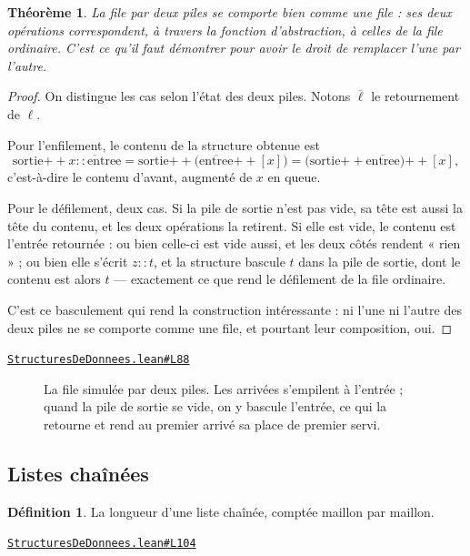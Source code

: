 \documentclass[11pt,a4paper]{article}
\theoremstyle{definition}
\newtheorem{definition}{Définition}
\theoremstyle{plain}
\newtheorem{theoreme}{Théorème}
\newcommand{\source}[2]{\par\smallskip\noindent\hfill{\footnotesize\href{#1}{\texttt{#2}}}\par\smallskip}
\begin{document}
\begin{theoreme}
La file par deux piles se comporte bien comme une file : ses deux opérations
correspondent, à travers la fonction d'abstraction, à celles de la file ordinaire.
C'est ce qu'il faut démontrer pour avoir le droit de remplacer l'une par l'autre.
\end{theoreme}
\begin{proof}
On distingue les cas selon l'état des deux piles. Notons \(\overline{\ell}\) le
retournement de \(\ell\).

Pour l'enfilement, le contenu de la structure obtenue est
\[ \mathrm{sortie} \mathbin{+\!\!+} \overline{x :: \mathrm{entree}}
   = \mathrm{sortie} \mathbin{+\!\!+}
     \bigl(\overline{\mathrm{entree}} \mathbin{+\!\!+} [x]\bigr)
   = \bigl(\mathrm{sortie} \mathbin{+\!\!+} \overline{\mathrm{entree}}\bigr)
     \mathbin{+\!\!+} [x] , \]
c'est-à-dire le contenu d'avant, augmenté de \(x\) en queue.

Pour le défilement, deux cas. Si la pile de sortie n'est pas vide, sa tête est aussi la
tête du contenu, et les deux opérations la retirent. Si elle est vide, le contenu est
l'entrée retournée : ou bien celle-ci est vide aussi, et les deux côtés rendent
« rien » ; ou bien elle s'écrit \(z :: t\), et la structure bascule \(t\) dans la pile de
sortie, dont le contenu est alors \(t\) — exactement ce que rend le défilement de la
file ordinaire.

C'est ce basculement qui rend la construction intéressante : ni l'une ni l'autre des
deux piles ne se comporte comme une file, et pourtant leur composition, oui.
\end{proof}
\source{https://github.com/Commutator-IO/learn-lean/blob/main/courses/02-lycee/11-informatique-nsi/StructuresDeDonnees.lean\#L88}{StructuresDeDonnees.lean\#L88}

\begin{figure}[h]
\centering

\caption{La file simulée par deux piles. Les arrivées s'empilent à l'entrée ; quand la pile de sortie se vide, on y bascule l'entrée, ce qui la retourne \textemdash{} et rend au premier arrivé sa place de premier servi.}
\end{figure}

\subsection{Listes chaînées}

\begin{definition}
La longueur d'une liste chaînée, comptée maillon par maillon.
\end{definition}
\source{https://github.com/Commutator-IO/learn-lean/blob/main/courses/02-lycee/11-informatique-nsi/StructuresDeDonnees.lean\#L104}{StructuresDeDonnees.lean\#L104}
\end{document}
